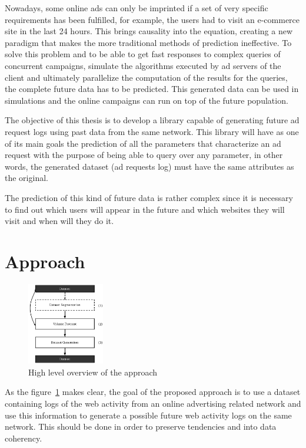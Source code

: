 \documentclass[9pt,a4paper]{extarticle}
\begin{document}
\begin{multicols}{2}
Nowadays, some online ads can only be imprinted if a set of very specific requirements has been fulfilled, for example,
the users had to visit an e-commerce site in the last 24 hours. This brings causality into the equation, creating a new paradigm that makes 
the more traditional methods of prediction ineffective. To solve this problem
and to be able to get fast responses to complex queries of concurrent campaigns,
simulate the algorithms executed by ad servers of the client
and ultimately parallelize the computation of the results for the
queries,
the complete future data has to be predicted. This generated data
can be used in simulations and the online campaigns can run on top of the future population.

The objective of this thesis is to develop a library capable of generating
future ad request logs using past data from the same network.
This library will have as one of its main goals the prediction of all the parameters that characterize an
ad request with the purpose of being able to query over any parameter, in other
words, the generated dataset (ad requests log) must have the same attributes as the original.

The prediction of this kind of future data is rather complex since it is
necessary to find out which users will appear in the future and which websites they
will visit and when will they do it.

\section{Approach}

\begin{figure}[H]
\centering
\includegraphics[width=0.3\textwidth]{high_level} \caption{ High level overview
of the approach } \label{fig:highlevel_arch} \end{figure}

As the figure~\ref{fig:highlevel_arch} makes clear, the goal of the
proposed approach is to use a dataset containing logs of the web
activity from an online advertising related network and use this information 
to generate a possible future web activity logs on the same network. 
This should be done in order to preserve tendencies and into data coherency.


\end{multicols}
\end{document}
